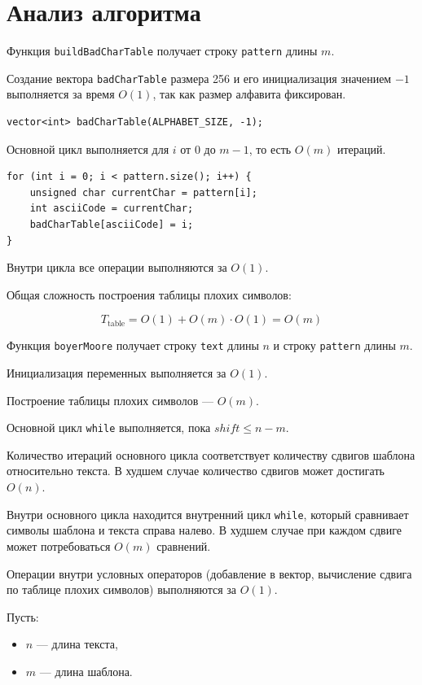 \documentclass[otchet]{SCWorks}
\begin{document}
\newpage

\section{Анализ алгоритма}

Функция \texttt{buildBadCharTable} получает строку \texttt{pattern} длины $m$.

Создание вектора \texttt{badCharTable} размера 256 и его инициализация значением $-1$ выполняется за время $O(1)$, так как размер алфавита фиксирован.

\begin{verbatim}
vector<int> badCharTable(ALPHABET_SIZE, -1);
\end{verbatim}

Основной цикл выполняется для $i$ от $0$ до $m-1$, то есть $O(m)$ итераций.

\begin{verbatim}
for (int i = 0; i < pattern.size(); i++) {
    unsigned char currentChar = pattern[i];
    int asciiCode = currentChar;
    badCharTable[asciiCode] = i;
}
\end{verbatim}

Внутри цикла все операции выполняются за $O(1)$.

Общая сложность построения таблицы плохих символов:

$$
T_{\text{table}} = O(1) + O(m) \cdot O(1) = O(m)
$$

Функция \texttt{boyerMoore} получает строку \texttt{text} длины $n$ и строку \texttt{pattern} длины $m$.

Инициализация переменных выполняется за $O(1)$.

Построение таблицы плохих символов — $O(m)$.

Основной цикл \texttt{while} выполняется, пока $shift \le n - m$.

Количество итераций основного цикла соответствует количеству сдвигов шаблона относительно текста. В худшем случае количество сдвигов может достигать $O(n)$.

Внутри основного цикла находится внутренний цикл \texttt{while}, который сравнивает символы шаблона и текста справа налево. В худшем случае при каждом сдвиге может потребоваться $O(m)$ сравнений.

Операции внутри условных операторов (добавление в вектор, вычисление сдвига по таблице плохих символов) выполняются за $O(1)$.

Пусть:
\begin{itemize}
\item $n$ — длина текста,
\item $m$ — длина шаблона.
\end{itemize}
\end{document}
